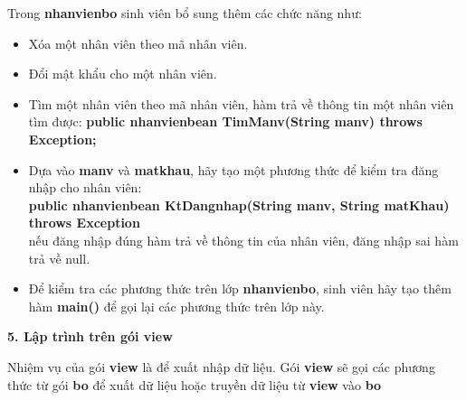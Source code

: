 Trong \textbf{nhanvienbo} sinh viên bổ sung thêm các chức năng như:
\begin{itemize}
	\item Xóa một nhân viên theo mã nhân viên.
	\item Đổi mật khẩu cho một nhân viên.
	\item Tìm một nhân viên theo mã nhân viên, hàm trả về thông tin một nhân viên tìm được: \textbf{public nhanvienbean TimManv(String manv) throws Exception;}
	\item Dựa vào \textbf{manv} và \textbf{matkhau}, hãy tạo một phương thức để kiểm tra đăng nhập cho nhân viên:\\
	 \textbf{public nhanvienbean KtDangnhap(String manv, String matKhau) throws Exception}\\
	  nếu đăng nhập đúng hàm trả về thông tin của nhân viên, đăng nhập sai hàm trả về null.
	\item Để kiểm tra các phương thức trên lớp \textbf{nhanvienbo}, sinh viên hãy tạo thêm hàm \textbf{main()} để gọi lại các phương thức trên lớp này.\\
\end{itemize}
 \textbf{5. Lập trình trên gói view}
 
 Nhiệm vụ của gói \textbf{view} là để  xuất nhập dữ liệu. Gói \textbf{view} sẽ gọi các phương thức từ gói \textbf{bo} để xuất dữ  liệu hoặc truyền dữ liệu từ \textbf{view} vào \textbf{bo}
 
